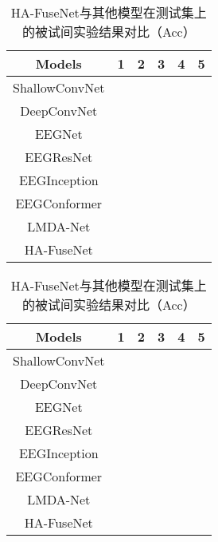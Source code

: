 \begin{table}[ht]
  \centering
  \caption{HA-FuseNet与其他模型在测试集上的被试间实验结果对比（Acc）}
  \label{tab:2acomparecross}
  \begin{tabularx}{\textwidth}{CCCCCC}
    \toprule
    Models & 1 & 2 & 3 & 4 & 5\\
    \midrule
    ShallowConvNet \\
    DeepConvNet \\
    EEGNet \\
    EEGResNet \\
    EEGInception \\
    EEGConformer \\
    LMDA-Net \\
    \midrule 
    HA-FuseNet \\
    \bottomrule
  \end{tabularx}
\end{table}
\begin{table}[ht]
  \centering
  \caption{HA-FuseNet与其他模型在测试集上的被试间实验结果对比（Acc）}
  \label{tab:2acomparecross}
  \begin{tabularx}{\textwidth}{CCCCCC}
    \toprule
    Models & 1 & 2 & 3 & 4 & 5\\
    \midrule
    ShallowConvNet \\
    DeepConvNet \\
    EEGNet \\
    EEGResNet \\
    EEGInception \\
    EEGConformer \\
    LMDA-Net \\
    \midrule 
    HA-FuseNet \\
    \bottomrule
  \end{tabularx}
\end{table}


